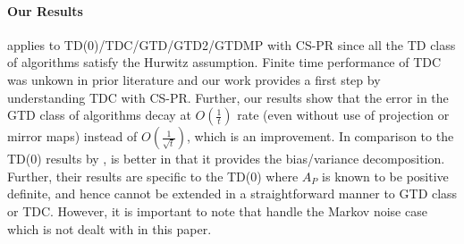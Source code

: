 \paragraph{Our Results}  applies to TD(0)/TDC/GTD/GTD2/GTDMP with CS-PR since all the TD class of algorithms satisfy the Hurwitz assumption. Finite time performance of TDC was unkown in prior literature and our work provides a first step by understanding TDC with CS-PR. Further, our results show that the error in the GTD class of algorithms decay at $O(\frac{1}{t})$ rate (even without use of projection or mirror maps) instead of $O(\frac{1}{\sqrt{t}})$,  which is an improvement. In comparison to the TD(0) results by \citet{korda-prashanth},  is better in that it provides the bias/variance decomposition. Further, their results are specific to the TD(0) where $A_P$ is known to be positive definite, and hence cannot be extended in a straightforward manner to GTD class or TDC.
However, it is important to note that \citet{korda-prashanth} handle the Markov noise case which is not dealt with in this paper.
